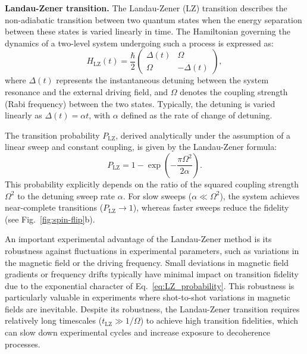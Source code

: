 \textbf{Landau-Zener transition.}
The Landau-Zener (LZ) transition \cite{landau_zur_1932,zener_non-adiabatic_1997} describes the non-adiabatic transition between two quantum states when the energy separation between these states is varied linearly in time. The Hamiltonian governing the dynamics of a two-level system undergoing such a process is expressed as:
\begin{equation}
H_{\text{LZ}}(t) = \frac{\hbar}{2}
\begin{pmatrix}
\Delta(t) & \Omega \\
\Omega & -\Delta(t)
\end{pmatrix},
\label{eq:LZ_Hamiltonian}
\end{equation}
where $\Delta(t)$ represents the instantaneous detuning between the system resonance and the external driving field, and $\Omega$ denotes the coupling strength (Rabi frequency) between the two states. Typically, the detuning is varied linearly as $\Delta(t) = \alpha t$, with $\alpha$ defined as the rate of change of detuning.

The transition probability $P_{\text{LZ}}$, derived analytically under the assumption of a linear sweep and constant coupling, is given by the Landau-Zener formula:
\begin{equation}
P_{\text{LZ}} = 1 - \exp\left(-\frac{\pi \Omega^2}{2\alpha}\right).
\label{eq:LZ_probability}
\end{equation}
This probability explicitly depends on the ratio of the squared coupling strength $\Omega^2$ to the detuning sweep rate $\alpha$. For slow sweeps ($\alpha \ll \Omega^2$), the system achieves near-complete transitions ($P_{\text{LZ}}\rightarrow1$), whereas faster sweeps reduce the fidelity (see Fig.~\ref{fig:spin-flip}b).

An important experimental advantage of the Landau-Zener method is its robustness against fluctuations in experimental parameters, such as variations in the magnetic field or the driving frequency. Small deviations in magnetic field gradients or frequency drifts typically have minimal impact on transition fidelity due to the exponential character of Eq.~\eqref{eq:LZ_probability}. This robustness is particularly valuable in experiments where shot-to-shot variations in magnetic fields are inevitable. Despite its robustness, the Landau-Zener transition requires relatively long timescales ($t_{\text{LZ}} \gg 1/\Omega$) to achieve high transition fidelities, which can slow down experimental cycles and increase exposure to decoherence processes.

